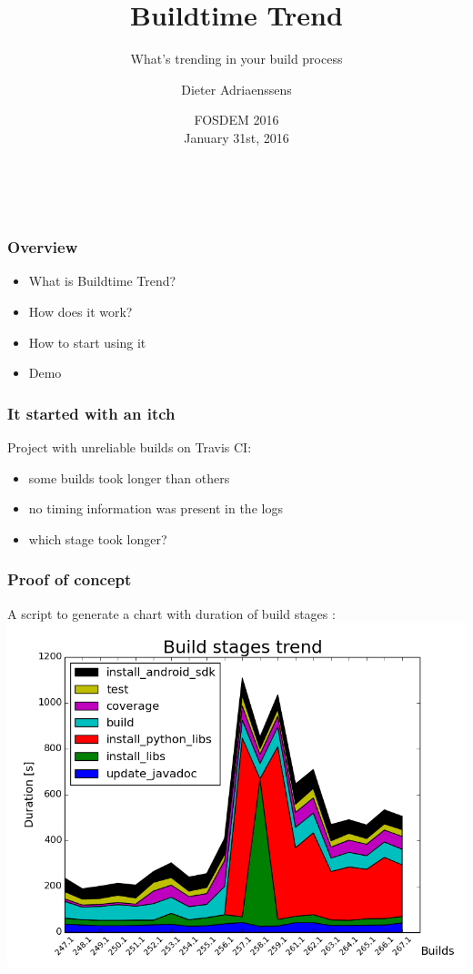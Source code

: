 \documentclass[14pt]{beamer}
\title[Buildtime Trend]{Buildtime Trend}
\subtitle{What's trending in your build process}
\author{Dieter Adriaenssens}
\institute[]{Buildtime Trend founder \& developer - @dcadriaenssens}
\date[FOSDEM 2016]{FOSDEM 2016\\
January 31st, 2016}
\begin{document}
  \begin{frame}
    \titlepage
    \vfill
    \begin{center}
      \\[2.5ex]
        {\tiny\CcNote{\CcLongnameByNcSa}}
        \vspace*{-2.5ex}
    \end{center}
  \end{frame}
  \begin{frame}
    \frametitle{Overview}
    \begin{itemize}
      \item What is Buildtime Trend?
      \item How does it work?
      \item How to start using it
      \item Demo
    \end{itemize}
  \end{frame}
  \begin{frame}
    \frametitle{It started with an itch}
    Project with unreliable builds on Travis CI:
    \begin{itemize}
      \item some builds took longer than others
      \item no timing information was present in the logs
      \item which stage took longer?
    \end{itemize}
  \end{frame}
  \begin{frame}
    \frametitle{Proof of concept}
    A script to generate a chart with duration of build stages :
    \includegraphics[scale=.45]{example_matplotlib_trend.png}
  \end{frame}
\end{document}
